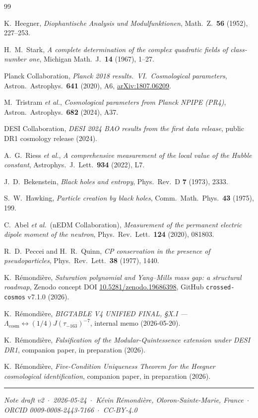 \documentclass[11pt,a4paper]{article}
\theoremstyle{plain}
\begin{document}
\begin{thebibliography}{99}

 K.~Heegner, \emph{Diophantische Analysis und Modulfunktionen}, Math.\ Z.\ \textbf{56} (1952), 227--253.

 H.~M.~Stark, \emph{A complete determination of the complex quadratic fields of class-number one}, Michigan Math.\ J.\ \textbf{14} (1967), 1--27.

 Planck Collaboration, \emph{Planck 2018 results.\ VI.\ Cosmological parameters}, Astron.\ Astrophys.\ \textbf{641} (2020), A6, \href{https://arxiv.org/abs/1807.06209}{arXiv:1807.06209}.

 M.~Tristram \emph{et al.}, \emph{Cosmological parameters from Planck NPIPE (PR4)}, Astron.\ Astrophys.\ \textbf{682} (2024), A37.

 DESI Collaboration, \emph{DESI 2024 BAO results from the first data release}, public DR1 cosmology release (2024).

 A.~G.~Riess \emph{et al.}, \emph{A comprehensive measurement of the local value of the Hubble constant}, Astrophys.\ J.\ Lett.\ \textbf{934} (2022), L7.

 J.~D.~Bekenstein, \emph{Black holes and entropy}, Phys.\ Rev.\ D \textbf{7} (1973), 2333.

 S.~W.~Hawking, \emph{Particle creation by black holes}, Comm.\ Math.\ Phys.\ \textbf{43} (1975), 199.

 C.~Abel \emph{et al.}\ (nEDM Collaboration), \emph{Measurement of the permanent electric dipole moment of the neutron}, Phys.\ Rev.\ Lett.\ \textbf{124} (2020), 081803.

 R.~D.~Peccei and H.~R.~Quinn, \emph{CP conservation in the presence of pseudoparticles}, Phys.\ Rev.\ Lett.\ \textbf{38} (1977), 1440.

 K.~R\'emondi\`ere, \emph{Saturation polynomial and Yang--Mills mass gap: a structural roadmap}, Zenodo concept DOI \href{https://doi.org/10.5281/zenodo.19686398}{10.5281/zenodo.19686398}, GitHub \texttt{crossed-cosmos} v7.1.0 (2026).

 K.~R\'emondi\`ere, \emph{BIGTABLE V4 UNIFIED FINAL, \S X.I --- $\Lambda_{\mathrm{cosm}}\leftrightarrow (1/4) J(\tau_{-163})^{-7}$}, internal memo (2026-05-20).

 K.~R\'emondi\`ere, \emph{Falsification of the Modular-Quintessence extension under DESI DR1}, companion paper, in preparation (2026).

 K.~R\'emondi\`ere, \emph{Five-Condition Uniqueness Theorem for the Heegner cosmological identification}, companion paper, in preparation (2026).

\end{thebibliography}

\bigskip
\hrule
\smallskip
\noindent\emph{Note draft v2 \,$\cdot$\, 2026-05-24 \,$\cdot$\, K\'evin R\'emondi\`ere, Oloron-Sainte-Marie, France \,$\cdot$\, ORCID 0009-0008-2443-7166 \,$\cdot$\, CC-BY-4.0}
\end{document}
